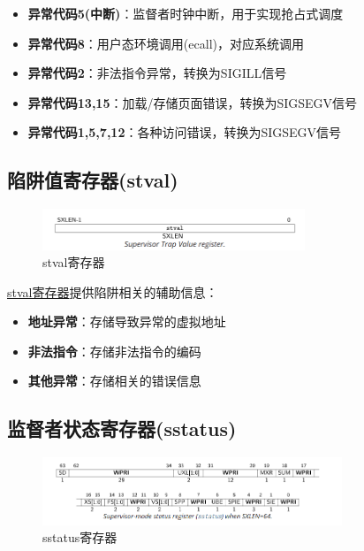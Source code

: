 \begin{itemize}
    \item \textbf{异常代码5(中断)}：监督者时钟中断，用于实现抢占式调度
    \item \textbf{异常代码8}：用户态环境调用(ecall)，对应系统调用
    \item \textbf{异常代码2}：非法指令异常，转换为SIGILL信号
    \item \textbf{异常代码13,15}：加载/存储页面错误，转换为SIGSEGV信号
    \item \textbf{异常代码1,5,7,12}：各种访问错误，转换为SIGSEGV信号
\end{itemize}

\subsection{陷阱值寄存器(stval)}

\begin{figure}[htbp]
    \centering
    \includegraphics[width=0.7\textwidth]{../image/stval.png}
    \caption{stval寄存器}
    \label{fig:stval}
\end{figure}

\href{https://five-embeddev.com/riscv-priv-isa-manual/Priv-v1.12/supervisor.html#supervisor-trap-value-stval-register}{stval寄存器}提供陷阱相关的辅助信息：

\begin{itemize}
    \item \textbf{地址异常}：存储导致异常的虚拟地址
    \item \textbf{非法指令}：存储非法指令的编码
    \item \textbf{其他异常}：存储相关的错误信息
\end{itemize}

\subsection{监督者状态寄存器(sstatus)}

\begin{figure}[htbp]
    \centering
    \includegraphics[width=0.8\textwidth]{../image/sstatus.png}
    \caption{sstatus寄存器}
    \label{fig:sstatus}
\end{figure}

